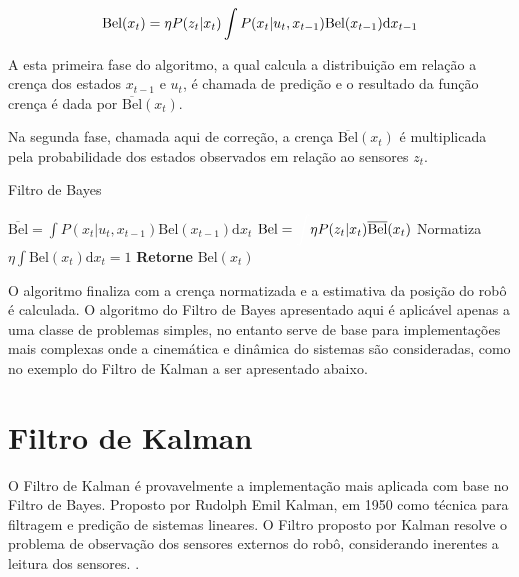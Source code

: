\begin{equation}
    \label{eq:bayes2}
    \text{\text{Bel}}(x_t) = \eta P(z_t| x_t) \int P(x_t| u_t, x_{t-1}) \text{Bel}(x_{t-1})\text{d}x_{t-1}
\end{equation}


A esta primeira fase do algoritmo, a qual calcula a distribuição em relação a crença dos estados $x_{t-1}$ e $u_t$, é chamada de predição e o resultado da função crença é dada por $\overline{\text{Bel}}(x_t)$.

Na segunda fase, chamada aqui de correção, a crença $\overline{\text{Bel}}(x_t)$ é multiplicada pela probabilidade dos estados observados em relação ao sensores $z_t$.

\begin{algorithm}[H]
    \caption{Filtro de Bayes}
    \begin{algorithmic}[1]
        \State $\overline{\text{Bel}}= \displaystyle\int P(x_t| u_t, x_{t-1})\text{Bel}(x_{t-1})\text{d}x_t$
    \EndProcedure
        \State ${\text{Bel}}= \displaystyle\textcolor{white}{\int}  \eta P(z_t| x_{t})\overline{\text{Bel}}(x_{t})$
    \EndProcedure
    \State Normatiza $\eta \displaystyle\int \text{Bel}(x_t)\text{d}x_t = 1$
    \State \textbf{Retorne} $\text{Bel}(x_t)$

    \end{algorithmic}
\end{algorithm}

O algoritmo finaliza com a crença normatizada e a estimativa da posição do robô é calculada. O algoritmo do Filtro de Bayes apresentado aqui é aplicável apenas a uma classe de problemas simples, no entanto serve de base para implementações mais complexas onde a cinemática e dinâmica do sistemas são consideradas, como no exemplo do Filtro de Kalman a ser apresentado abaixo.

\section{Filtro de Kalman}

O Filtro de Kalman é provavelmente a implementação mais aplicada com base no Filtro de Bayes. Proposto por Rudolph Emil Kalman, em 1950 como técnica para filtragem e predição de sistemas lineares. O Filtro proposto por Kalman resolve o problema de observação dos sensores externos do robô, considerando inerentes a leitura dos sensores. \cite{thrun2006probalistic,romero2014robotica}.

